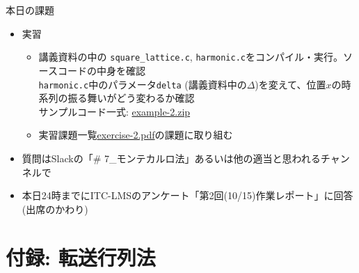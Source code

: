 \documentclass[10pt,dvipdfmx]{beamer}
\begin{document}
\section{}
\begin{frame}[t]{本日の課題}
  \begin{itemize}
  \item 実習
    \begin{itemize}
    \item 講義資料の中の {\tt square\_lattice.c}, {\tt harmonic.c}をコンパイル・実行。ソースコードの中身を確認 \\

      {\tt harmonic.c}中のパラメータ{\tt delta} (講義資料中の$\Delta$)を変えて、位置$x$の時系列の振る舞いがどう変わるか確認 \\
      
      サンプルコード一式: \href{https://github.com/todo-group/ComputerExperiments/releases/tag/2021a-computer2}{example-2.zip}
    \item 実習課題一覧\href{https://github.com/todo-group/ComputerExperiments/releases/tag/2021a-computer2}{exercise-2.pdf}の課題に取り組む
    \end{itemize}
  \item 質問はSlackの「\# 7\_モンテカルロ法」あるいは他の適当と思われるチャンネルで
  \item 本日24時までにITC-LMSのアンケート「第2回(10/15)作業レポート」に回答(出席のかわり)
  \end{itemize}
\end{frame}

\section{付録: 転送行列法}







\end{document}
